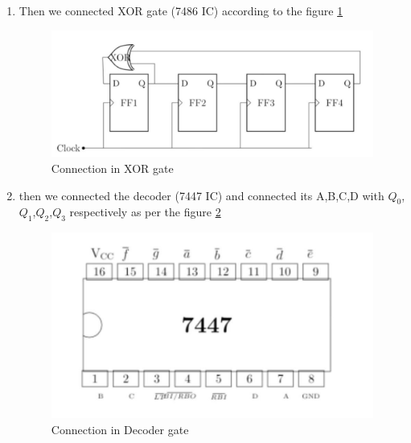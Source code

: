 \documentclass[journal,12pt,twocolumn]{IEEEtran}
\begin{document}
\begin{enumerate}
	\item Then we connected XOR gate (7486 IC) according to the figure \ref{XOR} 
	\begin{figure}[h]
		\includegraphics[width=\linewidth]{images/circuit_connections.jpg}
		\caption{Connection in XOR gate}
		\label{XOR}
	\end{figure}

	\item then we connected the decoder (7447 IC) and connected its A,B,C,D with $Q_0$,$Q_1$,$Q_2$,$Q_3$ respectively as per the figure \ref{7447}
	\begin{figure}[h]
		\includegraphics[width=\linewidth]{images/7447.jpg}
		\caption{Connection in Decoder gate}
		\label{7447}
	\end{figure}
		

\end{enumerate}
\end{document}
